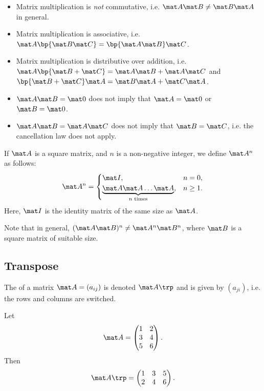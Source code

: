 \begin{fact}
    \phantom{.}
    \begin{itemize}
        \item Matrix multiplication is \emph{not} commutative, i.e. $\mat A \mat B \neq \mat B \mat A$ in general.
        \item Matrix multiplication is associative, i.e. $\mat A \bp{\mat B \mat C} = \bp{\mat A \mat B} \mat C$.
        \item Matrix multiplication is distributive over addition, i.e. $\mat A \bp{\mat B + \mat C} = \mat A \mat B + \mat A \mat C$ and $\bp{\mat B + \mat C} \mat A = \mat B \mat A + \mat C \mat A$.
        \item $\mat A \mat B = \mat 0$ does not imply that $\mat A = \mat 0$ or $\mat B = \mat 0$.
        \item $\mat A \mat B = \mat A \mat C$ does not imply that $\mat B = \mat C$, i.e. the cancellation law does not apply.
    \end{itemize}
\end{fact}

\begin{definition}
    If $\mat A$ is a square matrix, and $n$ is a non-negative integer, we define $\mat A^n$ as follows: \[\mat A^n = \begin{cases}
        \mat I, & n = 0,\\
        \underbrace{\mat A \mat A \dots \mat A}_{\text{$n$ times}}, & n \geq 1.
    \end{cases}\] Here, $\mat I$ is the identity matrix of the same size as $\mat A$.
\end{definition}

Note that in general, $(\mat A \mat B)^n \neq \mat A^n \mat B^n$, where $\mat B$ is a square matrix of suitable size.

\subsection{Transpose}

\begin{definition}
    The  of a matrix $\mat A = (a_{ij})$ is denoted $\mat A \trp$ and is given by $(a_{ji})$, i.e. the rows and columns are switched.
\end{definition}

\begin{example}[Transpose]
    Let \[\mat A = \begin{pmatrix}1 & 2 \\ 3 & 4 \\ 5 & 6\end{pmatrix}.\] Then \[\mat A \trp = \begin{pmatrix}1 & 3 & 5 \\ 2 & 4 & 6\end{pmatrix}.\]
\end{example}

